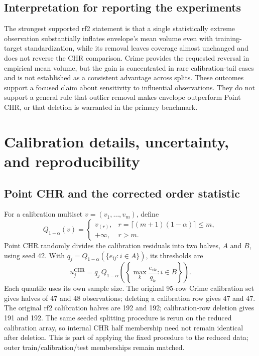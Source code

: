 \documentclass[11pt,letterpaper]{article}
\newcommand{\CHR}{\mathrm{CHR}}
\newcommand{\Q}{Q_{1-\alpha}}
\begin{document}
\subsection{Interpretation for reporting the experiments}
The strongest supported rf2 statement is that a single statistically extreme
observation substantially inflates envelope's mean volume even with
training-target standardization, while its removal leaves coverage almost
unchanged and does not reverse the CHR comparison. Crime provides the requested
reversal in empirical mean volume, but the gain is concentrated in rare
calibration-tail cases and is not established as a consistent advantage across
splits. These outcomes support a focused claim about sensitivity to influential
observations. They do not support a general rule that outlier removal makes
envelope outperform Point CHR, or that deletion is warranted in the primary
benchmark.

\appendix
\section{Calibration details, uncertainty, and reproducibility}
\subsection{Point CHR and the corrected order statistic}
For a calibration multiset $v=(v_1,\ldots,v_m)$, define
\begin{equation}
 \Q(v)=
 \begin{cases}
 v_{(r)}, & r=\lceil(m+1)(1-\alpha)\rceil\le m,\\
 +\infty, & r>m.
 \end{cases}
\end{equation}
Point CHR randomly divides the calibration residuals into two halves,
$A$ and $B$, using seed 42. With $q_j=\Q(\{e_{ij}:i\in A\})$, its thresholds are
\begin{equation}
 u_j^{\CHR}=q_j\,
 \Q\!\left(\left\{\max_k\frac{e_{ik}}{q_k}:i\in B\right\}\right).
\end{equation}
Each quantile uses its own sample size. The original 95-row Crime calibration
set gives halves of 47 and 48 observations; deleting a calibration row gives
47 and 47. The original rf2 calibration halves are 192 and 192; calibration-row
deletion gives 191 and 192. The same seeded splitting procedure is rerun on
the reduced calibration array, so internal CHR half membership need not remain
identical after deletion. This is part of applying the fixed procedure to
the reduced data; outer train/calibration/test memberships remain matched.
\end{document}

